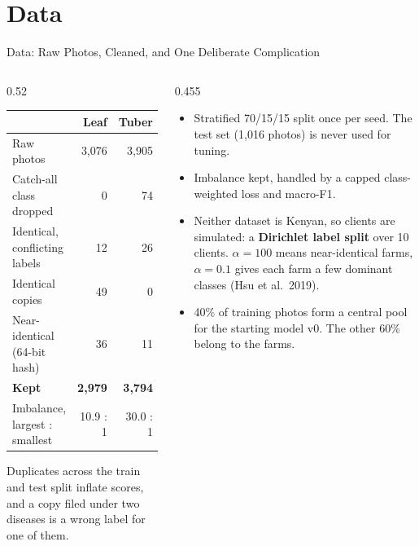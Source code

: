 \documentclass[11pt, aspectratio=169]{beamer}
\begin{document}
\section{Data}
\begin{frame}[t]{Data: Raw Photos, Cleaned, and One Deliberate Complication}
  \body
  \begin{columns}[T]
    \begin{column}{0.52\textwidth}
      \par\vspace{0.25em}
      \bodys
      \begin{tabular}{@{}lrr@{}}\toprule & Leaf & Tuber \\\midrule
        Raw photos & 3,076 & 3,905 \\
        Catch-all class dropped & 0 & 74 \\
        Identical, conflicting labels & 12 & 26 \\
        Identical copies & 49 & 0 \\
        Near-identical (64-bit hash) & 36 & 11 \\\midrule
        \textbf{Kept} & \textbf{2,979} & \textbf{3,794} \\
        Imbalance, largest : smallest & 10.9 : 1 & 30.0 : 1 \\\bottomrule
      \end{tabular}\par\vspace{0.5em}
      \body
      Duplicates across the train and test split inflate scores, and a copy filed under two diseases is a wrong label for one of them.
    \end{column}
    \begin{column}{0.455\textwidth}
      \par\vspace{0.25em}
      \begin{itemize}\setlength\itemsep{0.2em}
        \item Stratified 70/15/15 split once per seed. The test set (1,016 photos) is never used for tuning.
        \item Imbalance kept, handled by a capped class-weighted loss and macro-F1.
        \item Neither dataset is Kenyan, so clients are simulated: a \textbf{Dirichlet label split} over 10 clients. $\alpha=100$ means near-identical farms, $\alpha=0.1$ gives each farm a few dominant classes (Hsu et al.\ 2019).
        \item 40\% of training photos form a central pool for the starting model v0. The other 60\% belong to the farms.
      \end{itemize}
    \end{column}
  \end{columns}
\end{frame}
\end{document}
